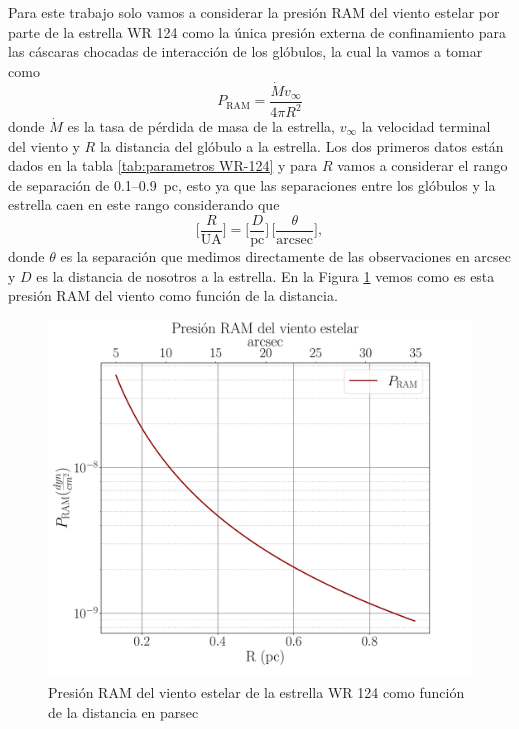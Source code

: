 \documentclass{book}
\begin{document}
Para este trabajo solo vamos a considerar la presión RAM del viento
estelar por parte de la estrella WR 124 como la única presión externa
de confinamiento para las cáscaras chocadas de interacción de los
glóbulos, la cual la vamos a tomar como
\begin{equation}
 P_\mathrm{RAM}= \frac{\dot{M}v_\infty}{4\pi R^2}    
\end{equation}
donde $\dot{M}$ es la tasa de pérdida de masa de la estrella,
$v_\infty$ la velocidad terminal del viento y $R$ la distancia del glóbulo
a la estrella. Los dos primeros datos están dados en la tabla
\ref{tab:parametros WR-124} y para $R$ vamos a considerar el rango de
separación de 0.1--\SI{0.9}{pc}, esto ya que las separaciones entre los
glóbulos y la estrella caen en este rango considerando que
\begin{equation}
    \Big[\frac{R}{\mathrm{UA}}\Big] = \Big[\frac{D}{\mathrm{pc}}\Big]\,\Big[\frac{\theta}{\mathrm{arcsec}}\Big],
\end{equation}
donde $\theta$ es la separación que medimos directamente de las
observaciones en arcsec y $D$ es la distancia de nosotros a la
estrella. En la Figura \ref{P_RAM} vemos como es esta presión RAM del
viento como función de la distancia.

\begin{figure}[htb]
    \centering    \includegraphics[width=\textwidth]{Nuevas imagenes finales/PRAMcgs_n.pdf}
    \caption{Presión RAM del viento estelar de la estrella WR 124 como función de la distancia en parsec}
    \label{P_RAM}
\end{figure}
\end{document}
